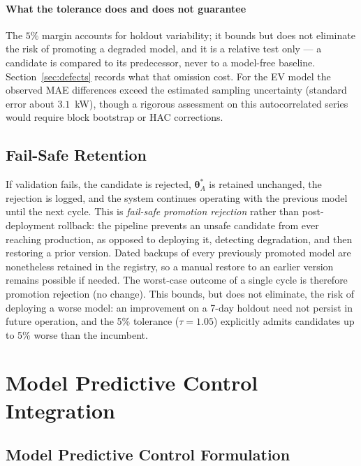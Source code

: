 \documentclass[journal]{IEEEtran}
\newcommand{\params}{\bm{\theta}}
\begin{document}
\paragraph{What the tolerance does and does not guarantee}
The $5\%$ margin accounts for holdout variability; it bounds but does not
eliminate the risk of promoting a degraded model, and it is a relative test
only --- a candidate is compared to its predecessor, never to a model-free
baseline. Section~\ref{sec:defects} records what that omission cost. For the EV
model the observed MAE differences exceed the estimated sampling uncertainty
(standard error about $3.1$~kW), though a rigorous assessment on this
autocorrelated series would require block bootstrap or HAC corrections.

\subsection{Fail-Safe Retention}

If validation fails, the candidate is rejected, $\params_A^*$ is retained
unchanged, the rejection is logged, and the system continues operating
with the previous model until the next cycle. This is \emph{fail-safe
promotion rejection} rather than post-deployment rollback: the pipeline
prevents an unsafe candidate from ever reaching production, as opposed to
deploying it, detecting degradation, and then restoring a prior version.
Dated backups of every previously promoted model are nonetheless retained
in the registry, so a manual restore to an earlier version remains
possible if needed. The worst-case outcome of a single cycle is therefore
promotion rejection (no change). This bounds, but does not eliminate, the
risk of deploying a worse model: an improvement on a 7-day holdout need
not persist in future operation, and the 5\% tolerance ($\tau=1.05$)
explicitly admits candidates up to 5\% worse than the incumbent.

\section{Model Predictive Control Integration}
\label{sec:mpcintegration}

\subsection{Model Predictive Control Formulation}
\label{sec:mpc}
\end{document}
